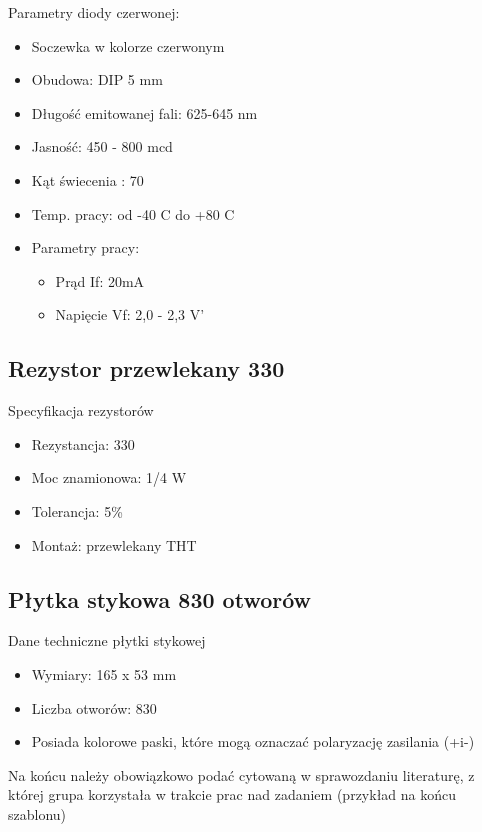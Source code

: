 \documentclass{classrep}
\begin{document}
Parametry diody czerwonej:
\begin{itemize}
  \item Soczewka w kolorze czerwonym
  \item Obudowa: DIP 5 mm
  \item Długość emitowanej fali: 625-645 nm
  \item Jasność: 450 - 800 mcd
  \item Kąt świecenia : 70 \degree
  \item Temp. pracy: od -40 \degree C do +80 \degree C
  \item Parametry pracy:
\begin{itemize}
  \item Prąd If: 20mA
  \item Napięcie Vf: 2,0 - 2,3 V'
\end{itemize}
\end{itemize}

\subsection {Rezystor przewlekany 330 \ohm}
Specyfikacja rezystorów
\begin{itemize}
  \item Rezystancja: 330 \ohm
  \item Moc znamionowa: 1/4 W
  \item Tolerancja: 5\%
  \item Montaż: przewlekany THT
\end{itemize}
\subsection {Płytka stykowa 830 otworów}
Dane techniczne płytki stykowej
\begin{itemize}
  \item Wymiary: 165 x 53 mm
  \item Liczba otworów: 830
  \item Posiada kolorowe paski, które mogą oznaczać polaryzację zasilania (+i-)
\end{itemize}

\begin{thebibliography}{0}
\end{thebibliography}
{\color{blue} 
Na końcu należy obowiązkowo podać cytowaną w sprawozdaniu
literaturę, z której grupa korzystała w trakcie prac nad zadaniem (przykład na
końcu szablonu)}
\end{document}
